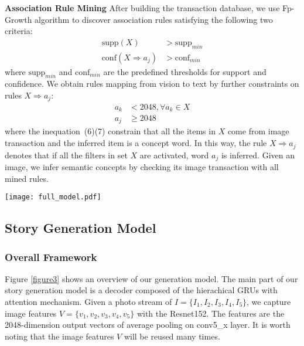 \documentclass[sigconf]{acmart}
\begin{document}
\textbf{Association Rule Mining}
After building the transaction database, we use Fp-Growth algorithm\cite{han2000mining} to discover association rules satisfying the following two criteria: 
\begin{align}
    \text{supp}(X) &>\text{supp}_{min} \\
    \text{conf}(X\Rightarrow a_j) &> \text{conf}_{min}
\end{align}
where $\text{supp}_{min}$ and $\text{conf}_{min}$ are the predefined thresholds for support and confidence. We obtain rules mapping from vision to text by further constraints on rules $X\Rightarrow a_j$:
\begin{align}
    a_k &< 2048, \forall a_k \in X \\
    a_j &\geq 2048
\end{align}
where the inequation~(6)(7) constrain that all the items in $X$ come from image transaction and the inferred item is a concept word.
In this way, the rule $X\Rightarrow a_j$ denotes that if all the filters in set $X$ are activated, word $a_j$ is inferred. Given an image, we infer semantic concepts by checking its image transaction with all mined rules. 

\begin{figure*}[t] 
\centering 
\texttt{[image: full\_model.pdf]} 
\caption{An overview of our story generation model. It contains an album GRU in red and a generation GRU in blue. We first extract image features with the Resnet152 and these features are used for the concepts inference and the generation GRU initialization. The features are also encoded to the visual context vectors and the inferred semantic concepts are fused to the semantic context vector. The input of the generation GRU is the concatenation of the last word, the visual context vector, and the semantic context vector. Finally, we concatenate all the generated sentences to form a story.} 
\label{figure3}
\end{figure*}

\subsection{Story Generation Model}
\subsubsection{Overall Framework}
Figure \ref{figure3} shows an overview of our generation model. The main part of our story generation model is a decoder composed of the hierachical GRUs with attention mechanism. Given a photo stream of $I=\{I_1,I_2,I_3,I_4,I_5\}$, we capture image features $V=\{v_1,v_2,v_3,v_4,v_5\}$ with the Resnet152. The features are the 2048-dimension output vectors of average pooling on conv5\_x layer. It is worth noting that the image features $V$ will be reused many times.
\end{document}
